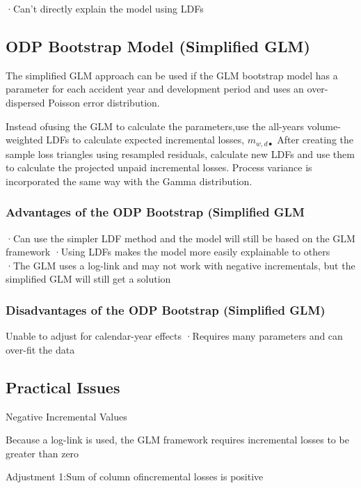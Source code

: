 \documentclass[
]{article}
\begin{document}
·Can't directly explain the model using LDFs

\subsection{ODP Bootstrap Model (Simplified
GLM)}\label{odp-bootstrap-model-simplified-glm}

The simplified GLM approach can be used if the GLM bootstrap model has a
parameter for each accident year and development period and uses an
over-dispersed Poisson error distribution.

Instead ofusing the GLM to calculate the parameters,use the all-years
volume-weighted LDFs to calculate expected incremental losses,
\(m_{w,d\bullet}\) After creating the sample loss triangles using
resampled residuals, calculate new LDFs and use them to calculate the
projected unpaid incremental losses. Process variance is incorporated
the same way with the Gamma distribution.

\subsubsection{Advantages of the ODP Bootstrap (Simplified
GLM}\label{advantages-of-the-odp-bootstrap-simplified-glm}

·Can use the simpler LDF method and the model will still be based on the
GLM framework ·Using LDFs makes the model more easily explainable to
others ·The GLM uses a log-link and may not work with negative
incrementals, but the simplified GLM will still get a solution

\subsubsection{Disadvantages of the ODP Bootstrap (Simplified
GLM)}\label{disadvantages-of-the-odp-bootstrap-simplified-glm}

Unable to adjust for calendar-year effects ·Requires many parameters and
can over-fit the data

\subsection{Practical Issues}\label{practical-issues}

Negative Incremental Values

Because a log-link is used, the GLM framework requires incremental
losses to be greater than zero

Adjustment 1:Sum of column ofincremental losses is positive
\end{document}
